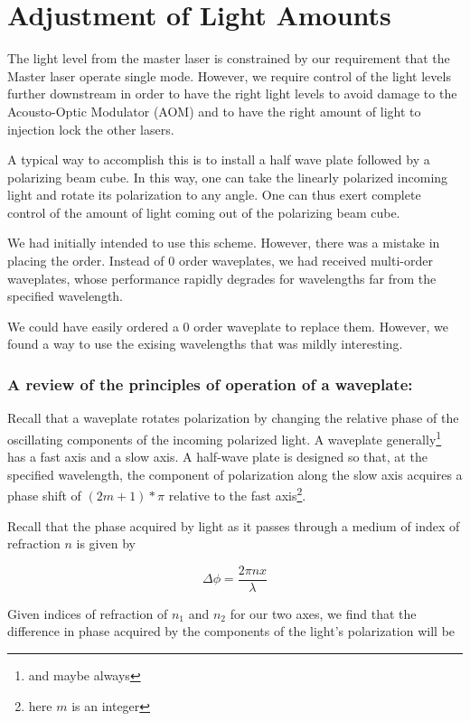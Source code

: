 
\chapter{Adjustment of Light Amounts}

The light level from the master laser is constrained by our requirement that the Master laser operate single mode. However, we require control of the light levels further downstream in order to have the right light levels to avoid damage to the Acousto-Optic Modulator (AOM) and to have the right amount of light to injection lock the other lasers. 

A typical way to accomplish this is to install a half wave plate followed by a polarizing beam cube. In this way, one can take the linearly polarized incoming light and rotate its polarization to any angle. One can thus exert complete control of the amount of light coming out of the polarizing beam cube. 

We had initially intended to use this scheme. However, there was a mistake in placing the order. Instead of 0 order waveplates, we had received multi-order waveplates, whose performance rapidly degrades for wavelengths far from the specified wavelength. 

We could have easily ordered a 0 order waveplate to replace them. However, we found a way to use the exising wavelengths that was mildly interesting.

\subsection{A review of the principles of operation of a waveplate: }

Recall that a waveplate rotates polarization by changing the relative phase of the oscillating components of the incoming polarized light. A waveplate generally\footnote{and maybe always} has a fast axis and a slow axis. A half-wave plate is designed so that, at the specified wavelength, the component of polarization along the slow axis acquires a phase shift of $(2m+1)*\pi$ relative to the fast axis\footnote{here $m$ is an integer}. 

Recall that the phase acquired by light as it passes through a medium of index of refraction $n$ is given by 

\begin{equation}
  \Delta \phi = \frac{2 \pi n x}{\lambda} \label{deltaPhi0}
\end{equation}

Given indices of refraction of $n_1$ and $n_2$ for our two axes, we find that the difference in phase acquired by the components of the light's polarization will be 

